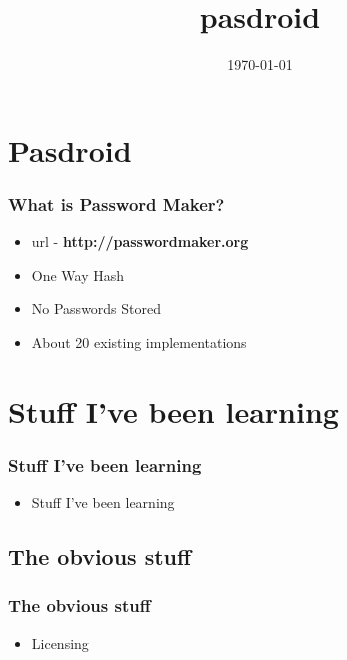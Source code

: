 \documentclass{beamer}
\title{pasdroid}
\date{\today}
\begin{document}
\frame{\titlepage}

\section{Pasdroid}
\frame 
{
    \frametitle{What is Password Maker?}

    \begin{itemize}
        \item url - \textbf{http://passwordmaker.org}\\
        \item One Way Hash\\ 
        \item No Passwords Stored\\
        \item About 20 existing implementations\\
    \end{itemize}
}

\section{Stuff I've been learning}
\frame
{
    \frametitle{Stuff I've been learning}

    \begin{itemize}
        \item Stuff I've been learning
    \end{itemize}
}

\subsection{The obvious stuff}
\frame
{
    \frametitle{The obvious stuff}

    \begin{itemize}
        \item Licensing
    \end{itemize}
}

\end{document}
